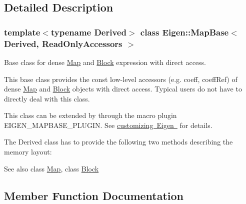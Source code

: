 \subsection{Detailed Description}
\subsubsection*{template$<$typename Derived$>$\newline
class Eigen\+::\+Map\+Base$<$ Derived, Read\+Only\+Accessors $>$}

Base class for dense \mbox{\hyperlink{class_eigen_1_1_map}{Map}} and \mbox{\hyperlink{class_eigen_1_1_block}{Block}} expression with direct access. 

This base class provides the const low-\/level accessors (e.\+g. coeff, coeff\+Ref) of dense \mbox{\hyperlink{class_eigen_1_1_map}{Map}} and \mbox{\hyperlink{class_eigen_1_1_block}{Block}} objects with direct access. Typical users do not have to directly deal with this class.

This class can be extended by through the macro plugin {\ttfamily E\+I\+G\+E\+N\+\_\+\+M\+A\+P\+B\+A\+S\+E\+\_\+\+P\+L\+U\+G\+IN}. See \mbox{\hyperlink{}{customizing Eigen }} for details.

The {\ttfamily Derived} class has to provide the following two methods describing the memory layout\+: 
\begin{DoxyCode}{0}
\end{DoxyCode}
 
\begin{DoxyCode}{0}
\end{DoxyCode}


\begin{DoxySeeAlso}{See also}
class \mbox{\hyperlink{class_eigen_1_1_map}{Map}}, class \mbox{\hyperlink{class_eigen_1_1_block}{Block}} 
\end{DoxySeeAlso}


\subsection{Member Function Documentation}
\mbox{\label{class_eigen_1_1_map_base_3_01_derived_00_01_read_only_accessors_01_4_ac303d927b8d2e3ac1e2fd76053c8119f}} 
